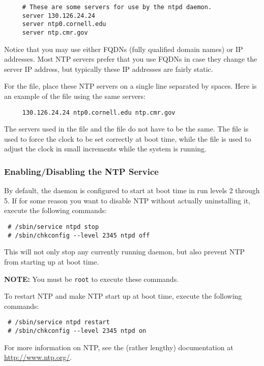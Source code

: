 \begin{verbatim}
     # These are some servers for use by the ntpd daemon.
     server 130.126.24.24
     server ntp0.cornell.edu
     server ntp.cmr.gov
\end{verbatim}

Notice that you may use either FQDNs (fully qualified domain names) or
IP addresses.  Most NTP servers prefer that you use FQDNs in case they
change the server IP address, but typically these IP addresses are
fairly static.

For the  file, place these NTP servers on
a single line separated by spaces.  Here is an example of the
 file using the same servers:

\begin{verbatim}
     130.126.24.24 ntp0.cornell.edu ntp.cmr.gov
\end{verbatim}

The servers used in the  file and the
 file do not have to be the same.  The
 file is used to force the clock to be set
correctly at boot time, while the  file is used to
adjust the clock in small increments while the system is running.

\subsubsection{Enabling/Disabling the NTP Service}

By default, the  daemon is configured to start at boot time
in run levels 2 through 5.  If for some reason you want to disable NTP
without actually uninstalling it, execute the following commands:

\begin{verbatim}
 # /sbin/service ntpd stop
 # /sbin/chkconfig --level 2345 ntpd off
\end{verbatim}

This will not only stop any currently running  daemon, but
also prevent NTP from starting up at boot time.

\bigskip 

{\bf NOTE:} You must be {\tt root} to execute these commands.

\bigskip 

To restart NTP and make NTP start up at boot time, execute the following
commands:

\begin{verbatim}
 # /sbin/service ntpd restart
 # /sbin/chkconfig --level 2345 ntpd on
\end{verbatim}

For more information on NTP, see the (rather lengthy) documentation at
\url{http://www.ntp.org/}.


